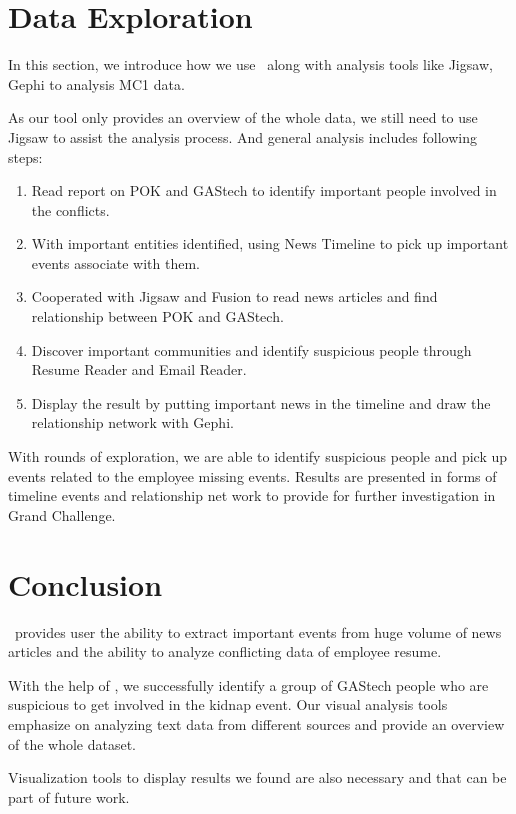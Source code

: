 \documentclass{vgtc}                          %
\begin{document}
\section{Data Exploration}
In this section, we introduce how we use \projectname\ along with analysis tools like Jigsaw, Gephi to analysis MC1 data.
\par
As our tool only provides an overview of the whole data, we still need to use Jigsaw to assist the analysis process. And general analysis includes following steps:
\begin{enumerate}
\item Read report on POK and GAStech to identify important people involved in the conflicts.
\item With important entities identified, using News Timeline to pick up important events associate with them.
\item Cooperated with Jigsaw and Fusion to read news articles and find relationship between POK and GAStech.
\item Discover important communities and identify suspicious people through Resume Reader and Email Reader.
\item Display the result by putting important news in the timeline and draw the relationship network with Gephi.
\end{enumerate}
\par
With rounds of exploration, we are able to identify suspicious people and pick up events related to the employee missing events. Results are presented in forms of timeline events and relationship net work to provide for further investigation in Grand Challenge.

\section{Conclusion}
\projectname\ provides user the ability to extract important events from huge volume of news articles and the ability to analyze conflicting data of employee resume.
\par
 With the help of \projectname, we successfully identify a group of GAStech people who are suspicious to get involved in the kidnap event. Our visual analysis tools emphasize on analyzing text data from different sources and provide an overview of the whole dataset.
 \par
 Visualization tools to display results we found are also necessary and that can be part of future work.


\end{document}
